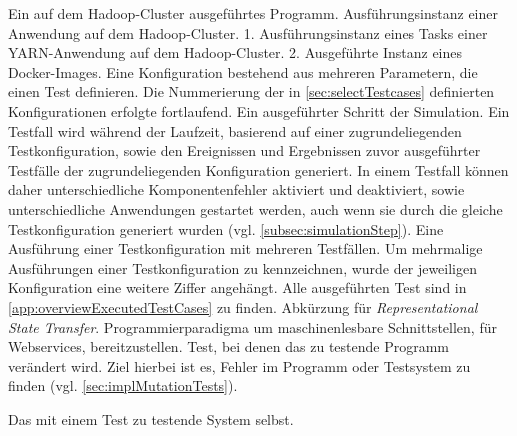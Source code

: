     {Ein auf dem Hadoop-Cluster ausgeführtes Programm.}
    {Ausführungsinstanz einer Anwendung auf dem Hadoop-Cluster.}
    {1. Ausführungsinstanz eines Tasks einer YARN-Anwendung auf dem Hadoop-Cluster.
        2. Ausgeführte Instanz eines Docker-Images.}
    {Eine Konfiguration bestehend aus mehreren Parametern, die einen Test definieren.
        Die Nummerierung der in \cref{sec:selectTestcases} definierten Konfigurationen erfolgte fortlaufend.}
    {Ein ausgeführter Schritt der Simulation.
        Ein Testfall wird während der Laufzeit, basierend auf einer zugrundeliegenden Testkonfiguration, sowie den Ereignissen und Ergebnissen zuvor ausgeführter Testfälle der zugrundeliegenden Konfiguration generiert.
        In einem Testfall können daher unterschiedliche Komponentenfehler aktiviert und deaktiviert, sowie unterschiedliche Anwendungen gestartet werden, auch wenn sie durch die gleiche Testkonfiguration generiert wurden (vgl. \cref{subsec:simulationStep}).}
    {Eine Ausführung einer Testkonfiguration mit mehreren Testfällen.
        Um mehrmalige Ausführungen einer Testkonfiguration zu kennzeichnen, wurde der jeweiligen Konfiguration eine weitere Ziffer angehängt.
        Alle ausgeführten Test sind in \cref{app:overviewExecutedTestCases} zu finden.}
    {Abkürzung für \emph{Representational State Transfer}.
        Programmierparadigma um maschinenlesbare Schnittstellen, \zB für Webservices, bereitzustellen.}
    {Test, bei denen das zu testende Programm verändert wird.
        Ziel hierbei ist es, Fehler im Programm oder Testsystem zu finden (vgl. \cref{sec:implMutationTests}).}

    {Das mit einem Test zu testende System selbst.}
